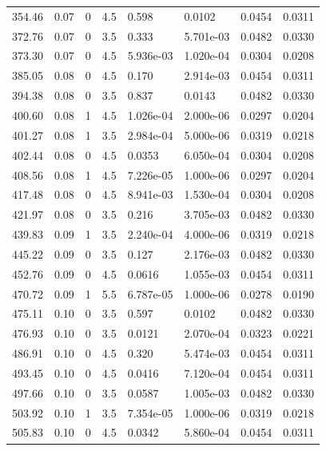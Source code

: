 \documentclass[preview]{standalone}
\begin{document}
{{{\begin{tabular}{L{1.2cm}C{1.2cm} C{0.3cm}C{0.5cm} C{1.4cm}C{1.4cm} C{1.4cm}C{1.4cm}}
  354.46  &  0.07  & 0     & 4.5 &  0.598  & 0.0102  & 0.0454 &  0.0311   \\ 
  372.76  &  0.07  & 0     & 3.5 &  0.333  & 5.701e-03  & 0.0482 &  0.0330   \\ 
  373.30  &  0.07  & 0     & 4.5 &  5.936e-03  & 1.020e-04  & 0.0304 &  0.0208   \\ 
  385.05  &  0.08  & 0     & 4.5 &  0.170  & 2.914e-03  & 0.0454 &  0.0311   \\ 
  394.38  &  0.08  & 0     & 3.5 &  0.837  & 0.0143  & 0.0482 &  0.0330   \\ 
  400.60  &  0.08  & 1     & 4.5 &  1.026e-04  & 2.000e-06  & 0.0297 &  0.0204   \\ 
  401.27  &  0.08  & 1     & 3.5 &  2.984e-04  & 5.000e-06  & 0.0319 &  0.0218   \\ 
  402.44  &  0.08  & 0     & 4.5 &  0.0353  & 6.050e-04  & 0.0304 &  0.0208   \\ 
  408.56  &  0.08  & 1     & 4.5 &  7.226e-05  & 1.000e-06  & 0.0297 &  0.0204   \\ 
  417.48  &  0.08  & 0     & 4.5 &  8.941e-03  & 1.530e-04  & 0.0304 &  0.0208   \\ 
  421.97  &  0.08  & 0     & 3.5 &  0.216  & 3.705e-03  & 0.0482 &  0.0330   \\ 
  439.83  &  0.09  & 1     & 3.5 &  2.240e-04  & 4.000e-06  & 0.0319 &  0.0218   \\ 
  445.22  &  0.09  & 0     & 3.5 &  0.127  & 2.176e-03  & 0.0482 &  0.0330   \\ 
  452.76  &  0.09  & 0     & 4.5 &  0.0616  & 1.055e-03  & 0.0454 &  0.0311   \\ 
  470.72  &  0.09  & 1     & 5.5 &  6.787e-05  & 1.000e-06  & 0.0278 &  0.0190   \\ 
  475.11  &  0.10  & 0     & 3.5 &  0.597  & 0.0102  & 0.0482 &  0.0330   \\ 
  476.93  &  0.10  & 0     & 3.5 &  0.0121  & 2.070e-04  & 0.0323 &  0.0221   \\ 
  486.91  &  0.10  & 0     & 4.5 &  0.320  & 5.474e-03  & 0.0454 &  0.0311   \\ 
  493.45  &  0.10  & 0     & 4.5 &  0.0416  & 7.120e-04  & 0.0454 &  0.0311   \\ 
  497.66  &  0.10  & 0     & 3.5 &  0.0587  & 1.005e-03  & 0.0482 &  0.0330   \\ 
  503.92  &  0.10  & 1     & 3.5 &  7.354e-05  & 1.000e-06  & 0.0319 &  0.0218   \\ 
  505.83  &  0.10  & 0     & 4.5 &  0.0342  & 5.860e-04  & 0.0454 &  0.0311   \\ 

\end{tabular}}}}
\end{document}
